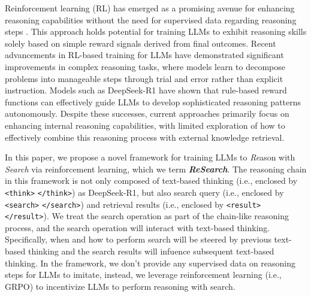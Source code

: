 \documentclass{article}
\begin{document}
Reinforcement learning (RL) has emerged as a promising avenue for enhancing reasoning capabilities without the need for supervised data regarding reasoning steps \cite{deepseek-r1,deepseekmath}. This approach holds potential for training LLMs to exhibit reasoning skills solely based on simple reward signals derived from final outcomes. 
Recent advancements in RL-based training for LLMs have demonstrated significant improvements in complex reasoning tasks, where models learn to decompose problems into manageable steps through trial and error rather than explicit instruction. Models such as DeepSeek-R1 have shown that rule-based reward functions can effectively guide LLMs to develop sophisticated reasoning patterns autonomously. Despite these successes, current approaches primarily focus on enhancing internal reasoning capabilities, with limited exploration of how to effectively combine this reasoning process with external knowledge retrieval. 

In this paper, we propose a novel framework for training LLMs to \textit{Re}ason with \textit{Search} via reinforcement learning, which we term \textbf{\textit{ReSearch}}.
The reasoning chain in this framework is not only composed of text-based thinking (i.e., enclosed by \texttt{<think>} \texttt{</think>}) as DeepSeek-R1, but also search query (i.e., enclosed by \texttt{<search>} \texttt{</search>}) and retrieval results (i.e., enclosed by \texttt{<result>} \texttt{</result>}).
We treat the search operation as part of the chain-like reasoning process, and the search operation will interact with text-based thinking. Specifically, when and how to perform search will be steered by previous text-based thinking and the search results will infuence subsequent text-based thinking.
In the framework, we don't provide any supervised data on reasoning steps for LLMs to imitate, instead, we leverage reinforcement learning (i.e., GRPO) to incentivize LLMs to perform reasoning with search.
\end{document}

